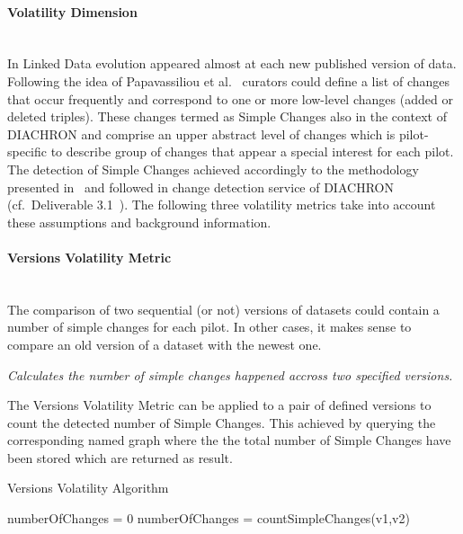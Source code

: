 
\paragraph{Volatility Dimension}~\\ %
In Linked Data evolution appeared almost at each new published version of data. Following the idea of Papavassiliou et al.~\cite{TODS13} curators could define a list of changes that occur frequently and correspond to one or more low-level changes (added or deleted triples). These changes termed as Simple Changes also in the context of DIACHRON and comprise an upper abstract level of changes which is pilot-specific to describe group of changes that appear a special interest for each pilot. The detection of Simple Changes achieved accordingly to the methodology presented in~\cite{TODS13} and followed in change detection service of DIACHRON (cf.\ Deliverable 3.1~\cite{diachron-D3.1}). The following three volatility metrics take into account these assumptions and background information.

\paragraph{Versions Volatility Metric} ~\\ %
The comparison of two sequential (or not) versions of datasets could contain a number of simple changes for each pilot. In other cases, it makes sense to compare an old version of a dataset with the newest one. 

\begin{mdframed}[style=metricdefinition]
\emph{Calculates the number of simple changes happened accross two specified versions.}
\end{mdframed}

The Versions Volatility Metric can be applied to a pair
of defined versions to count the detected number of Simple Changes. This achieved by querying the corresponding named graph where the the total number of Simple Changes have been stored which are returned as result. 

\begin{algorithm}
\caption{Versions Volatility Algorithm}
\begin{algorithmic}[1]
\State numberOfChanges = 0
\EndProcedure
{}
\State numberOfChanges = countSimpleChanges(v1,v2)
\EndProcedure
\State {}
\end{algorithmic}
\end{algorithm}

